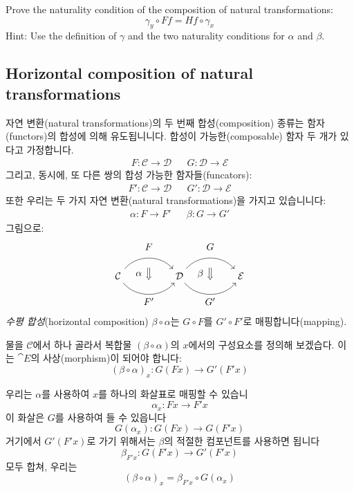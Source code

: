 \documentclass[DaoFP]{subfiles}
\begin{document}
\begin{exercise}
Prove the naturality condition of the composition of natural transformations:
\[ \gamma_y \circ F f = H f \circ \gamma_x \]
Hint: Use the definition of $\gamma$ and the two naturality conditions for $\alpha$ and $\beta$.
\end{exercise}


\subsection{Horizontal composition of natural transformations}

자연 변환(natural transformations)의 두 번째 합성(composition) 종류는 함자(functors)의 합성에 의해 유도됩니니다. 합성이 가능한(composable) 함자 두 개가 있다고 가정합니다.
\begin{align*}
 F \colon \mathcal{C} \to \mathcal{D}
&&G \colon \mathcal{D} \to \mathcal{E} 
\end{align*}
그리고, 동시에, 또 다른 쌍의 합성 가능한 함자들(funcators):
\begin{align*}
 F' \colon \mathcal{C} \to \mathcal{D}
&& G' \colon \mathcal{D} \to \mathcal{E} 
\end{align*}
또한 우리는 두 가지 자연 변환(natural transformations)을 가지고 있습니니다:
\begin{align*}
\alpha \colon F \to F'  
&& \beta \colon G \to G' 
\end{align*}
그림으로:
\[
\begin{tikzcd}[column sep=huge]
\mathcal{C}
  \arrow[bend left=50]{r}[name=U, label=above:$F$]{}
  \arrow[bend right=50]{r}[name=D, label=below:$F'$]{} 
 &
\mathcal{D}
  \arrow[bend left=50]{r}[name=U1, label=above:$G$]{}
  \arrow[bend right=50]{r}[name=D1, label=below:$G'$]{} 
 &
\mathcal{E}
  \arrow[shorten <=10pt,shorten >=10pt,Rightarrow,to path={(U) -- node[label=left:$\alpha$] {} (D)}]{}
  \arrow[shorten <=10pt,shorten >=10pt,Rightarrow,to path={(U1) -- node[label=left:$\beta$] {} (D1)}]{}
\end{tikzcd}
\]
\emph{수평 합성}(horizontal composition) $\beta \circ \alpha$는 $G \circ F$를 $G' \circ F'$로 매핑합니다(mapping).

물을 $\mathcal{C}$에서 하나 골라서 복합물 $(\beta \circ \alpha)$의 $x$에서의 구성요소를 정의해 보겠습다. 이는 $\cat E$의 사상(morphism)이 되어야 합니다:
\[ (\beta \circ \alpha)_x \colon G ( F x) \to G' ( F' x) \]

우리는 $\alpha$를 사용하여 $x$를 하나의 화살표로 매핑할 수 있습니
\[ \alpha_x \colon F x \to F' x \]
이 화살은 $G$를 사용하여 들 수 있읍니다
\[ G (\alpha_x) \colon G (F x) \to G (F' x) \]
거기에서 $G' (F' x)$로 가기 위해서는 $\beta$의 적절한 컴포넌트를 사용하면 됩니다
\[ \beta_{F' x} \colon G (F' x) \to G' (F' x) \]
모두 합쳐, 우리는
\[ (\beta \circ \alpha)_x = \beta_{F' x} \circ G (\alpha_x) \]
\end{document}
